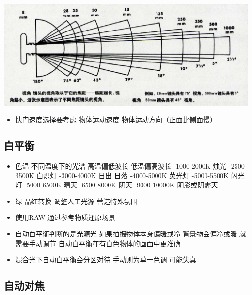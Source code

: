 \documentclass[
  letterpaper,
  DIV=11,
  numbers=noendperiod]{scrreprt}
\providecommand{\tightlist}{%
  \setlength{\itemsep}{0pt}\setlength{\parskip}{0pt}}\usepackage{longtable,booktabs,array}
\begin{document}
\includegraphics{images/shijiao.png}

\begin{itemize}
\tightlist
\item
  快门速度选择要考虑 物体运动速度 物体运动方向（正面比侧面慢）
\end{itemize}

\subsection{白平衡}\label{ux767dux5e73ux8861}

\begin{itemize}
\tightlist
\item
  色温 不同温度下的光谱 高温偏低波长 低温偏高波长 -1000-2000K 烛光
  -2500-3500K 白炽灯 -3000-4000K 日出 日落 -4000-5000K 荧光灯
  -5000-5500K 闪光灯 -5000-6500K 晴天 -6500-8000K 阴天 -9000-10000K
  阴影或阴霾天
\item
  绿-品红转换 调整人工光源 营造特殊氛围
\item
  使用RAW 通过参考物质还原场景
\item
  自动白平衡判断的是光源光 如果拍摄物体本身偏暖或冷 背景物会偏冷或暖
  就需要手动调节 自动白平衡在有白色物体的画面中更准确
\item
  混合光下自动白平衡会分区对待 手动则为单一色调 可能失真
\end{itemize}

\subsection{自动对焦}\label{ux81eaux52a8ux5bf9ux7126}
\end{document}
